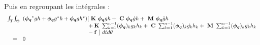 Puis en regroupant les intégrales :
\begin{equation}
\begin{array}{r l}
	\int_T \! \int_\Theta \!\!\!&		
		(\boldsymbol{\phi_q}^*gh + \boldsymbol{\phi_q}g^*h + \boldsymbol{\phi_q}gh^*)[~\mathbf{K}~ \boldsymbol{\phi_q}gh
						+ ~\mathbf{C}~ \boldsymbol{\phi_q} \dot{g}h 
						+ ~\mathbf{M}~ \boldsymbol{\phi_q} \ddot{g}h
	\\
	  &
		\phantom{(\boldsymbol{\phi_q}^*gh + \boldsymbol{\phi_q}g^*h + \boldsymbol{\phi_q}gh^*)
			}+ \mathbf{K}~ \sum_{k=1}^{n-1} (\boldsymbol{\phi_q})_k       g_k  h_k 
			+ ~\mathbf{C}~ \sum_{k=1}^{n-1} (\boldsymbol{\phi_q})_k  \dot{g_k} h_k 
			+ ~\mathbf{M}~ \sum_{k=1}^{n-1} (\boldsymbol{\phi_q})_k \ddot{g_k} h_k
	\\
	  &
		\phantom{(\boldsymbol{\phi_q}^*gh + \boldsymbol{\phi_q} g^*h + \boldsymbol{\phi_q} gh^*)} -\mathbf{f}~] ~dt d\theta
	\\
	= &0
\end{array}
\end{equation}
%